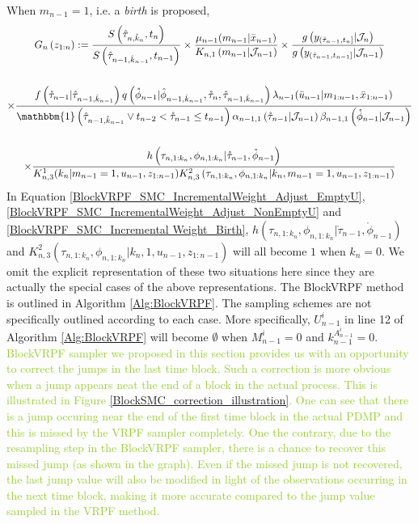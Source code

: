 \documentclass[12pt,a4paper]{article}
\begin{document}
When $m_{n-1} = 1$, i.e. a \textit{birth} is proposed, 
\begin{multline}
    \label{BlockVRPF_SMC_Incremental Weight_Birth}
    G_{n}\left(z_{1:n}\right) := \frac{S\left(\hat{\tau}_{n,\hat{k}_n},t_n\right)}{S\left(\hat{\tau}_{n-1,\hat{k}_{n-1}},t_{n-1}\right)} \times \frac{\mu_{n-1}(m_{n-1}|\bar{x}_{n-1})}{K_{n,1}\left(m_{n-1}|\mathcal{J}_{n-1}\right)}\times \frac{g\left(y_{(\mathring{\tau}_{n-1},t_n]}|\mathcal{J}_n\right)}{g\left(y_{(\mathring{\tau}_{n-1},t_{n-1}]}|\mathcal{J}_{n-1}\right)}\\\\
    \times \frac{f\left(\mathring{\tau}_{n-1}|\hat{\tau}_{n-1,\hat{k}_{n-1}}\right)q\left(\mathring{\phi}_{n-1}|\hat{\phi}_{n-1,\hat{k}_{n-1}},\mathring{\tau}_{n},\hat{\tau}_{n-1,\hat{k}_{n-1}}\right)\lambda_{n-1}(\bar{u}_{n-1}|m_{1:n-1},\bar{x}_{1:n-1})}{\mathbbm{1}\left(\hat{\tau}_{n-1,\hat{k}_{n-1}} \vee t_{n-2}  < \mathring{\tau}_{n-1} \leq t_{n-1} \right)\alpha_{n-1,1}\left(\mathring{\tau}_{n-1}|\mathcal{J}_{n-1}\right)\beta_{n-1,1}\left(\mathring{\phi}_{n-1}|\mathcal{J}_{n-1}\right)}\\\\
    \times \frac{h\left(\tau_{n,1:k_n},\phi_{n,1:k_n}|\mathring{\tau}_{n-1},\mathring{\phi}_{n-1}\right)}{K_{n,3}^1(k_n|m_{n-1}=1,u_{n-1},z_{1:n-1})K_{n,3}^{2}\left(\tau_{n,1:k_n},\phi_{n,1:k_n}|k_n,m_{n-1}=1,u_{n-1},z_{1:n-1}\right)}
\end{multline}
In Equation \eqref{BlockVRPF_SMC_IncrementalWeight_Adjust_EmptyU}, \eqref{BlockVRPF_SMC_IncrementalWeight_Adjust_NonEmptyU} and \eqref{BlockVRPF_SMC_Incremental Weight_Birth}, $h\left(\tau_{n,1:k_n},\phi_{n,1:k_n}|\mathring{\tau}_{n-1},\mathring{\phi}_{n-1}\right)$ and $K_{n,3}^{2}\left(\tau_{n,1:k_n},\phi_{n,1:k_n}|k_n,1,u_{n-1},z_{1:n-1}\right)$ will all become $1$ when $k_n=0$. We omit the explicit representation of these two situations here since they are actually the special cases of the above representations. 
The BlockVRPF method is outlined in Algorithm \ref{Alg:BlockVRPF}. The sampling schemes are not specifically outlined according to each case. More specifically, $U_{n-1}^i$ in line 12 of Algorithm \ref{Alg:BlockVRPF} will become $\emptyset$ when $M_{n-1}^i = 0$ and $k_{n-1}^{A_{n-1}^i} = 0$. \textcolor{YellowGreen}
{BlockVRPF sampler we proposed in this section provides us with an opportunity to correct the jumps in the last time block. Such a correction is more obvious when a jump appears neat the end of a block in the actual process. This is illustrated in Figure \ref{BlockSMC_correction_illustration}. One can see that there is a jump occuring near the end of the first time block in the actual PDMP and this is missed by the VRPF sampler completely. One the contrary, due to the resampling step in the BlockVRPF sampler, there is a chance to recover this missed jump (as shown in the graph). Even if the missed jump is not recovered, the last jump value will also be modified in light of the observations occurring in the next time block, making it more accurate compared to the jump value sampled in the VRPF method.}
\end{document}
